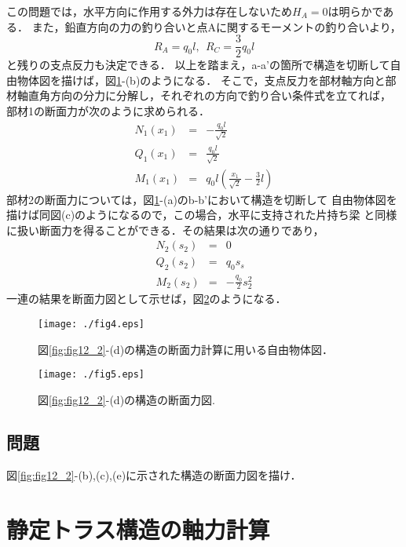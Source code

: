 \documentclass[10pt,a4j]{jarticle}
\begin{document}
この問題では，水平方向に作用する外力は存在しないため$H_A=0$は明らかである．
また，鉛直方向の力の釣り合いと点Aに関するモーメントの釣り合いより，
\begin{equation}
	R_A=q_0l, \ \ R_C=\frac{3}{2}q_0l
\end{equation}
と残りの支点反力も決定できる．
以上を踏まえ，a-a'の箇所で構造を切断して自由物体図を描けば，図\ref{fig:fig12_4}-(b)のようになる．
そこで，支点反力を部材軸方向と部材軸直角方向の分力に分解し，それぞれの方向で釣り合い条件式を立てれば，
部材1の断面力が次のように求められる．
\begin{eqnarray}
	N_1(x_1) &= & -\frac{q_0l}{\sqrt{2}} 
	\\
	Q_1(x_1) &= & \frac{q_0l}{\sqrt{2}} 
	\\
	M_1(x_1) &= & q_0l \left( \frac{x_1}{\sqrt{2}}-\frac{3}{2}l\right) 
\end{eqnarray}
部材2の断面力については，図\ref{fig:fig12_4}-(a)のb-b'において構造を切断して
自由物体図を描けば同図(c)のようになるので，この場合，水平に支持された片持ち梁
と同様に扱い断面力を得ることができる．その結果は次の通りであり，
\begin{eqnarray}
	N_2(s_2) &= & 0
	\\
	Q_2(s_2) &= & q_0s_s
	\\
	M_2(s_2) &= & -\frac{q_0}{2}s_2^2
\end{eqnarray}
一連の結果を断面力図として示せば，図\ref{fig:fig12_5}のようになる．
\begin{figure}[h]
	\begin{center}
	\texttt{[image: ./fig4.eps]} 
	\end{center}
	\caption{
		図\ref{fig:fig12_2}-(d)の構造の断面力計算に用いる自由物体図．
	} 
	\label{fig:fig12_4}
\end{figure}
\begin{figure}[h]
	\begin{center}
	\texttt{[image: ./fig5.eps]} 
	\end{center}
	\caption{
		図\ref{fig:fig12_2}-(d)の構造の断面力図.
	} 
	\label{fig:fig12_5}
\end{figure}
\subsection{問題}
図\ref{fig:fig12_2}-(b),(c),(e)に示された構造の断面力図を描け．
\section{静定トラス構造の軸力計算}
\end{document}
